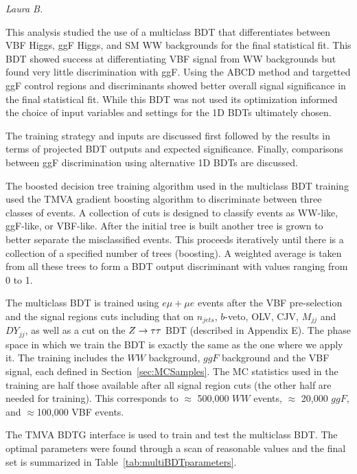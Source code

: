 \textit{Laura B.} 

This analysis studied the use of a multiclass BDT that differentiates between VBF Higgs, ggF Higgs, and SM WW backgrounds for the final statistical fit. This BDT showed success at differentiating VBF signal from WW backgrounds but found very little discrimination with ggF. Using the ABCD method and targetted ggF control regions and discriminants showed better overall signal significance in the final statistical fit. While this BDT was not used its optimization informed the choice of input variables and settings for the 1D BDTs ultimately chosen. 

The training strategy and inputs are discussed first followed by the results in terms of projected BDT outputs and expected significance. Finally, comparisons between ggF discrimination using alternative 1D BDTs are discussed. 

The boosted decision tree training algorithm used in the multiclass BDT training used the TMVA gradient boosting algorithm to discriminate between three classes of events. A collection of cuts is designed to classify events as WW-like, ggF-like, or VBF-like. After the initial tree is built another tree is grown to better separate the misclassified events. This proceeds iteratively until there is a collection of a specified number of trees (boosting). A weighted average is taken from all these trees to form a BDT output discriminant with values ranging from 0 to 1.

The multiclass BDT is trained using $e\mu+\mu e$ events after the VBF pre-selection and the signal regions cuts including that on $n_{jets}$, $b$-veto, OLV, CJV, $M_{jj}$ and $DY_{jj}$, as well as a cut on the $Z\rightarrow\tau\tau$ BDT (described in Appendix E). The phase space in which we train the BDT is exactly the same as the one where we apply it. The training includes the $WW$ background, $ggF$ background and the VBF signal, each defined in Section~\ref{sec:MCSamples}. The MC statistics used in the training are half those available after all signal region cuts (the other half are needed for training). This corresponds to $\approx$ 500,000 $WW$ events, $\approx$ 20,000 $ggF$, and $\approx$100,000 VBF events.

The TMVA BDTG interface is used to train and test the multiclass BDT. The optimal parameters were found through a scan of reasonable values and the final set is summarized in Table~\ref{tab:multiBDTparameters}.

